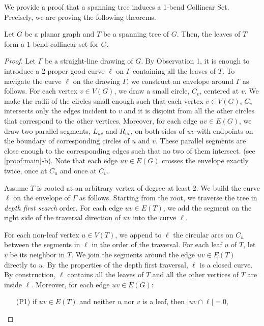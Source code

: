We provide a proof that a spanning tree induces a 1-bend Collinear Set. Precisely, we are proving the following theorems.

\begin{thm} \label{app-main}

Let $G$ be a planar graph and $T$ be a spanning tree of $G$. Then, the leaves of $T$ form a $1$-bend collinear set for $G$.

\end{thm}

\begin{proof}
    Let $\Gamma$ be a straight-line drawing of $G$.
    By Observation 1, it is enough to introduce a 2-proper good curve $\ell$ on $\Gamma$ containing all the leaves of $T$. To navigate the curve $\ell$ on the drawing $\Gamma$, we construct an envelope around $\Gamma$ as follows. For each vertex $v \in V(G)$, we draw a small circle, $C_v$, centered at $v$. We make the radii of the circles small enough such that each vertex $v \in V(G)$, $C_v$ intersects only the edges incident to $v$ and it is disjoint from all the other circles that correspond to the other vertices. Moreover, for each edge $uv \in E(G)$, we draw two parallel segments, $L_{uv}$ and $R_{uv}$, on both sides of $uv$ with endpoints on the boundary of corresponding circles of $u$ and $v$. These parallel segments are close enough to the corresponding edges such that no two of them intersect. (see \cref{proof:main}-b). Note that each edge $uv \in E(G)$ crosses the envelope exactly twice, once at $C_u$ and once at $C_v$.

    Assume $T$ is rooted at an arbitrary vertex of degree at least 2. We build the curve $\ell$ on the envelope of $\Gamma$ as follows. Starting from the root, we traverse the tree in \textit{depth first search} order. For each edge $uv \in E(T)$, we add the segment on the right side of the traversal direction of $uv$ into the curve $\ell$.

    For each non-leaf vertex $u \in V(T)$, we append to $\ell$ the circular arcs on $C_u$ between the segments in $\ell$ in the order of the traversal. For each leaf $u$ of $T$, let $v$ be its neighbor in $T$. We join the segments around the edge $uv \in E(T)$ directly to $u$. By the properties of the depth first traversal, $\ell$ is a closed curve. By construction, $\ell$ contains all the leaves of $T$ and all the other vertices of $T$ are inside $\ell$. Moreover, for each edge $uv \in E(G)$:

    \begin{enumerate}
        \item [(P1)] if $uv \in E(T)$ and neither $u$ nor $v$ is a leaf, then $|uv \cap \ell| = 0$,


\end{enumerate}
\end{proof}
